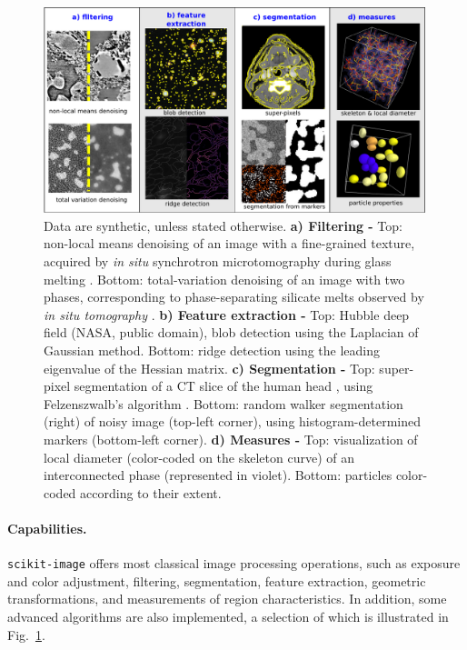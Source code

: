 \documentclass[twocolumn]{bmcart}%
\begin{document}
\begin{figure}
    \centerline{\includegraphics[width=0.99\textwidth]{tomo_gallery}}
    \caption{
	Data are synthetic, unless stated otherwise.
	\textbf{a) Filtering -} Top: non-local means denoising of an image
	with a fine-grained texture, acquired by \emph{in situ}
	synchrotron microtomography during
	glass melting \citep{Gouillart2012}. Bottom: total-variation
	denoising of an image with two phases, corresponding to
	phase-separating silicate melts observed by \emph{in situ
	tomography} \citep{Bouttes2015}.
	\textbf{b) Feature extraction -} Top: Hubble deep field (NASA,
	public domain), blob detection using the
	Laplacian of Gaussian method. Bottom: ridge detection using the
	leading eigenvalue of the Hessian matrix.
	\textbf{c) Segmentation - } Top: super-pixel segmentation
	of a CT slice of the human head \citep{tomo_wikipedia}, using
	Felzenszwalb's algorithm \citep{Felzenszwalb2004}. Bottom: random
	walker segmentation (right) of noisy image (top-left corner), using
	histogram-determined markers (bottom-left corner).
	\textbf{d) Measures -} Top: visualization of local diameter
	(color-coded on the skeleton curve) of an
	interconnected phase (represented in violet).  Bottom: particles color-coded according
	to their extent.
\label{fig:tomo_gallery}}
\end{figure}

\paragraph{Capabilities.}

\texttt{scikit-image} offers most classical image processing operations,
such as exposure and color adjustment, filtering,
segmentation, feature extraction, geometric transformations, and
measurements of region characteristics. In addition, some advanced
algorithms are also implemented, a selection of which is illustrated in
Fig.~\ref{fig:tomo_gallery}.  
\end{document}
